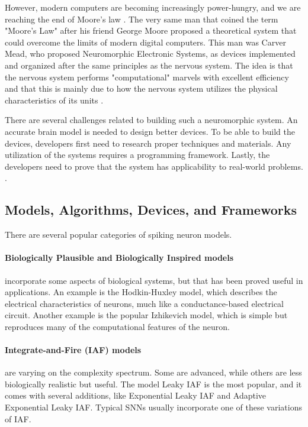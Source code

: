 However, modern computers are becoming increasingly power-hungry, and we are reaching the end of Moore's law \cite{mead_neuromorphic_1990} \cite{moore_cramming_1998}.
The very same man that coined the term "Moore's Law" after his friend George Moore proposed a theoretical system that could overcome the limits of modern digital computers.
This man was Carver Mead, who proposed Neuromorphic Electronic Systems, as devices implemented and organized after the same principles as the nervous system.
The idea is that the nervous system performs "computational" marvels with excellent efficiency and that this is mainly due to how the nervous system utilizes the physical characteristics of its units \cite{mead_neuromorphic_1990}.

There are several challenges related to building such a neuromorphic system.
An accurate brain model is needed to design better devices.
To be able to build the devices, developers first need to research proper techniques and materials.
Any utilization of the systems requires a programming framework.
Lastly, the developers need to prove that the system has applicability to real-world problems.
\cite{schuman_survey_2017}.

\subsection{Models, Algorithms, Devices, and Frameworks}
There are several popular categories of spiking neuron models.

\paragraph{Biologically Plausible and Biologically Inspired models} incorporate some aspects of biological systems, but that has been proved useful in applications.
An example is the Hodkin-Huxley model, which describes the electrical characteristics of neurons, much like a conductance-based electrical circuit.
Another example is the popular Izhikevich model, which is simple but reproduces many of the computational features of the neuron.
\cite{schuman_survey_2017}

\paragraph{Integrate-and-Fire (IAF) models} are varying on the complexity spectrum. Some are advanced, while others are less biologically realistic but useful.
The model Leaky IAF is the most popular, and it comes with several additions, like Exponential Leaky IAF and Adaptive Exponential Leaky IAF. Typical SNNs usually incorporate one of these variations of IAF.
\cite{schuman_survey_2017}

